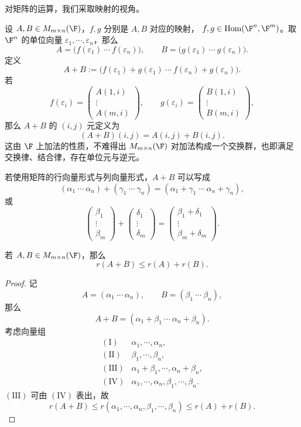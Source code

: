 对矩阵的运算，我们采取映射的视角。

\begin{definition}[矩阵加法]\label{p1:concept:c3-l395}
	设 $A,B\in M_{m\times n}(\F)$，$f,g$ 分别是 $A,B$ 对应的映射，
	$f,g\in\operatorname{Hom}(\F^n,\F^m)$。取 $\F^n$ 的单位向量
	$\varepsilon_1,\cdots,\varepsilon_n$，那么
	\[
	A=\bigl(f(\varepsilon_1)\ \cdots\ f(\varepsilon_n)\bigr),
	\qquad
	B=\bigl(g(\varepsilon_1)\ \cdots\ g(\varepsilon_n)\bigr).
	\]
	定义
	\[
	A+B:=\bigl(f(\varepsilon_1)+g(\varepsilon_1)\ \cdots\
	f(\varepsilon_n)+g(\varepsilon_n)\bigr).
	\]
	若
	\[
	f(\varepsilon_i)=
	\begin{pmatrix}
		A(1,i)\\ \vdots\\ A(m,i)
	\end{pmatrix},
	\qquad
	g(\varepsilon_i)=
	\begin{pmatrix}
		B(1,i)\\ \vdots\\ B(m,i)
	\end{pmatrix},
	\]
	那么 $A+B$ 的 $(i,j)$ 元定义为
	\[
	(A+B)(i,j)=A(i,j)+B(i,j).
	\]
	这由 $\F$ 上加法的性质，不难得出
	$M_{m\times n}(\F)$ 对加法构成一个交换群，也即满足交换律、结合律，存在单位元与逆元。
	

\end{definition}
	若使用矩阵的行向量形式与列向量形式，$A+B$ 可以写成
\[
(\alpha_1\ \cdots\ \alpha_n)+(\gamma_1\ \cdots\ \gamma_n)
=(\alpha_1+\gamma_1\ \cdots\ \alpha_n+\gamma_n),
\]
或
\[
\begin{pmatrix}
	\beta_1\\ \vdots\\ \beta_m
\end{pmatrix}
+
\begin{pmatrix}
	\delta_1\\ \vdots\\ \delta_m
\end{pmatrix}
=
\begin{pmatrix}
	\beta_1+\delta_1\\ \vdots\\ \beta_m+\delta_m
\end{pmatrix}.
\]
\begin{proposition}
	若 $A,B\in M_{m\times n}(\F)$，那么
	\[
	r(A+B)\leq r(A)+r(B).
	\]
\end{proposition}

\begin{proof}
	记
	\[
	A=(\alpha_1\ \cdots\ \alpha_n),\qquad
	B=(\beta_1\ \cdots\ \beta_n),
	\]
	那么
	\[
	A+B=(\alpha_1+\beta_1\ \cdots\ \alpha_n+\beta_n).
	\]
	考虑向量组
	\[
	\begin{array}{ll}
		(\mathrm{I})&\alpha_1,\cdots,\alpha_n,\\
		(\mathrm{II})&\beta_1,\cdots,\beta_n,\\
		(\mathrm{III})&\alpha_1+\beta_1,\cdots,\alpha_n+\beta_n,\\
		(\mathrm{IV})&\alpha_1,\cdots,\alpha_n,\beta_1,\cdots,\beta_n.
	\end{array}
	\]
	$(\mathrm{III})$ 可由 $(\mathrm{IV})$ 表出，故
	\[
	r(A+B)
	\leq r(\alpha_1,\cdots,\alpha_n,\beta_1,\cdots,\beta_n)
	\leq r(A)+r(B).
	\]
\end{proof}

